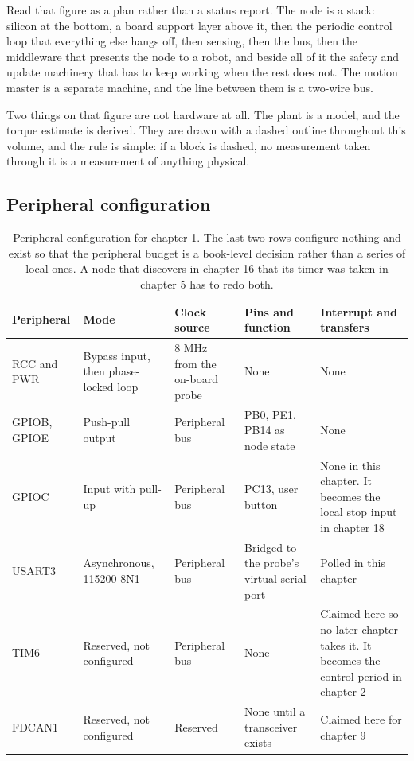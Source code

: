 
Read that figure as a plan rather than a status report. The node is a stack:
silicon at the bottom, a board support layer above it, then the periodic control
loop that everything else hangs off, then sensing, then the bus, then the
middleware that presents the node to a robot, and beside all of it the safety
and update machinery that has to keep working when the rest does not. The motion
master is a separate machine, and the line between them is a two-wire bus.

Two things on that figure are not hardware at all. The plant is a model, and the
torque estimate is derived. They are drawn with a dashed outline throughout this
volume, and the rule is simple: if a block is dashed, no measurement taken
through it is a measurement of anything physical.

\subsection*{Peripheral configuration}

\begin{table}[H]\centering\small
\begin{tabular}{p{22mm}p{26mm}p{24mm}p{30mm}p{30mm}}
\toprule
Peripheral & Mode & Clock source & Pins and function & Interrupt and transfers \\
\midrule
RCC and PWR & Bypass input, then phase-locked loop & 8 MHz from the on-board probe & None & None \\
GPIOB, GPIOE & Push-pull output & Peripheral bus & PB0, PE1, PB14 as node state & None \\
GPIOC & Input with pull-up & Peripheral bus & PC13, user button & None in this chapter. It becomes the local stop input in chapter 18 \\
USART3 & Asynchronous, 115200 8N1 & Peripheral bus & Bridged to the probe's virtual serial port & Polled in this chapter \\
TIM6 & Reserved, not configured & Peripheral bus & None & Claimed here so no later chapter takes it. It becomes the control period in chapter 2 \\
FDCAN1 & Reserved, not configured & Reserved & None until a transceiver exists & Claimed here for chapter 9 \\
\bottomrule
\end{tabular}
\caption{Peripheral configuration for chapter 1. The last two rows configure nothing and exist so that the peripheral budget is a book-level decision rather than a series of local ones. A node that discovers in chapter 16 that its timer was taken in chapter 5 has to redo both.}
\end{table}


